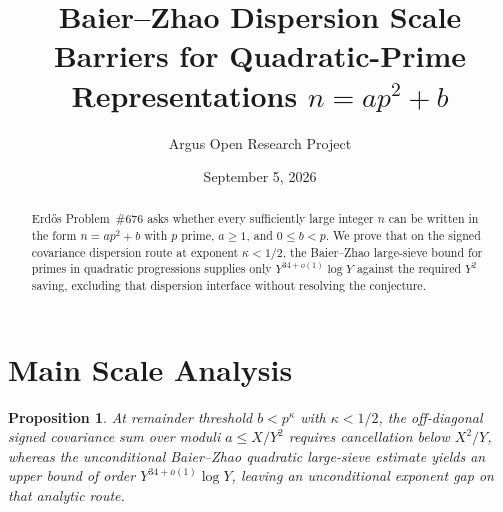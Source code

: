 \documentclass[10pt,reqno]{amsart}
\title[Dispersion Scale Barriers for Representing Integers as $a p^2 + b$ (Erd\H{o}s \#676)]
{Baier--Zhao Dispersion Scale Barriers for Quadratic-Prime Representations $n = a p^2 + b$}
\author{Argus Open Research Project}
\date{September 5, 2026}
\newtheorem{proposition}[theorem]{Proposition}
\theoremstyle{definition}
\begin{document}
\begin{abstract}
Erd\H{o}s Problem~\#676 asks whether every sufficiently large integer $n$ can be written in the form $n = a p^2 + b$ with $p$ prime, $a\ge 1$, and $0\le b < p$. We prove that on the signed covariance dispersion route at exponent $\kappa < 1/2$, the Baier--Zhao large-sieve bound for primes in quadratic progressions supplies only $Y^{34+o(1)}\log Y$ against the required $Y^2$ saving, excluding that dispersion interface without resolving the conjecture.
\end{abstract}
\maketitle
\section{Main Scale Analysis}
\begin{proposition}
At remainder threshold $b < p^\kappa$ with $\kappa < 1/2$, the off-diagonal signed covariance sum over moduli $a\le X/Y^2$ requires cancellation below $X^2/Y$, whereas the unconditional Baier--Zhao quadratic large-sieve estimate yields an upper bound of order $Y^{34+o(1)}\log Y$, leaving an unconditional exponent gap on that analytic route.
\end{proposition}
\end{document}
